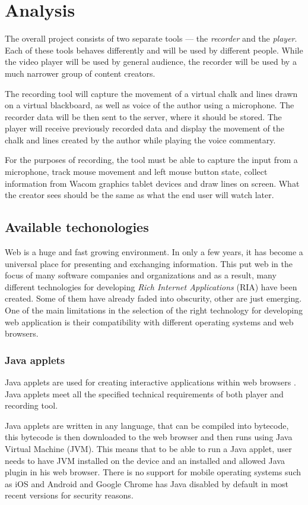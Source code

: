 \chapter{Analysis}

The overall project consists of two separate tools --- the \textit{recorder} and the \textit{player}. Each of these tools behaves differently and will be used by different people. While the video player will be used by general audience, the recorder will be used by a much narrower group of content creators.

The recording tool will capture the movement of a virtual chalk and lines drawn on a virtual blackboard, as well as voice of the author using a microphone. The recorder data will be then sent to the server, where it should be stored. The player will receive previously recorded data and display the movement of the chalk and lines created by the author while playing the voice commentary.

For the purposes of recording, the tool must be able to capture the input from a microphone, track mouse movement and left mouse button state, collect information from Wacom graphics tablet devices and draw lines on screen. What the creator sees should be the same as what the end user will watch later.

\section{Available techonologies}
Web is a huge and fast growing environment. In only a few years, it has become a universal place for presenting and exchanging information. This put web in the focus of many software companies and organizations and as a result, many different technologies for developing \textit{Rich Internet Applications} (RIA) have been created. Some of them have already faded into obscurity, other are just emerging. One of the main limitations in the selection of the right technology for developing web application is their compatibility with different operating systems and web browsers.

\subsection{Java applets}
Java applets are used for creating interactive applications within web browsers \cite{java}. Java applets meet all the specified technical requirements of both player and recording tool.

Java applets are written in any language, that can be compiled into bytecode, this bytecode is then downloaded to the web browser and then runs using Java Virtual Machine (JVM). This means that to be able to run a Java applet, user needs to have JVM installed on the device and an installed and allowed Java plugin in his web browser. There is no support for mobile operating systems such as iOS and Android \cite{java_mobile} and Google Chrome has Java disabled by default in most recent versions  for security reasons.

